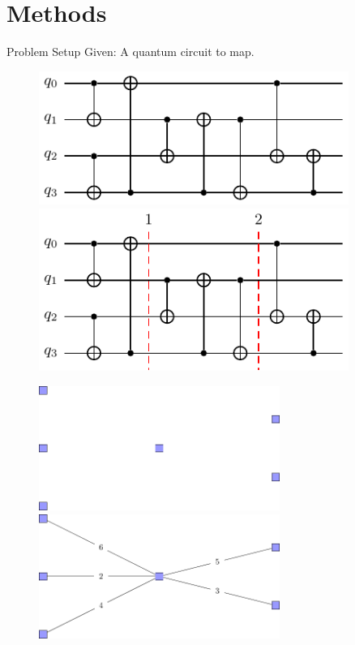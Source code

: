 \documentclass{beamer}
\begin{document}
\section{Methods}
\begin{frame}{Problem Setup}
	Given: A quantum circuit to map.
\pause
\begin{minipage}{0.5\textwidth}
\begin{figure}
     \centering
		\begin{overprint}
		\centering
		\includegraphics[width=0.9\textwidth]{figures/big_circuit}
		\onslide<3->\centering
		\includegraphics[width=0.9\textwidth]{figures/big_circuit_sliced}
		\end{overprint}
     \hfill %
		\begin{overprint}
		\centering
		\includegraphics[width=0.7\textwidth]{figures/many_mappings}
		\onslide<5>\centering
		\includegraphics[width=0.7\textwidth]{figures/many_mappings_weights}

\end{overprint}
\end{figure}
\end{minipage}
\end{frame}
\end{document}
